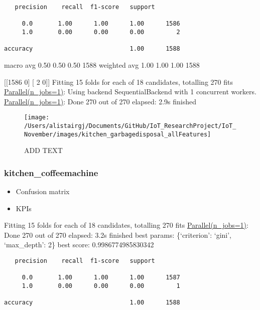 \documentclass[11pt,]{article}
\providecommand{\tightlist}{%
  \setlength{\itemsep}{0pt}\setlength{\parskip}{0pt}}
\begin{document}
\begin{verbatim}
   precision    recall  f1-score   support

     0.0       1.00      1.00      1.00      1586
     1.0       0.00      0.00      0.00         2

accuracy                           1.00      1588
\end{verbatim}

macro avg 0.50 0.50 0.50 1588 weighted avg 1.00 1.00 1.00 1588

{[}{[}1586 0{]} {[} 2 0{]}{]} Fitting 15 folds for each of 18
candidates, totalling 270 fits
\href{Done\%20270\%20out\%20of\%20270\%20\%7C\%20elapsed:\%202.1s\%20finished}{Parallel(n\_jobs=1)}:
Using backend SequentialBackend with 1 concurrent workers.
\href{Done\%20270\%20out\%20of\%20270\%20\%7C\%20elapsed:\%202.1s\%20finished}{Parallel(n\_jobs=1)}:
Done 270 out of 270 \textbar{} elapsed: 2.9s finished

\begin{figure}[H]

{\centering \texttt{[image: /Users/alistairgj/Documents/GitHub/IoT\_ResearchProject/IoT\_November/images/kitchen\_garbagedisposal\_allFeatures]} 

}

\caption{ADD TEXT}\label{fig:unnamed-chunk-16}
\end{figure}

\pagebreak

\hypertarget{kitchen_coffeemachine}{%
\subsubsection{kitchen\_coffeemachine}\label{kitchen_coffeemachine}}

\begin{itemize}
\tightlist
\item
  Confusion matrix
\item
  KPIs
\end{itemize}

Fitting 15 folds for each of 18 candidates, totalling 270 fits
\href{Done\%20270\%20out\%20of\%20270\%20\%7C\%20elapsed:\%202.1s\%20finished}{Parallel(n\_jobs=1)}:
Done 270 out of 270 \textbar{} elapsed: 3.2s finished best params:
\{`criterion': `gini', `max\_depth': 2\} best score: 0.9986774985830342

\begin{verbatim}
   precision    recall  f1-score   support

     0.0       1.00      1.00      1.00      1587
     1.0       0.00      0.00      0.00         1

accuracy                           1.00      1588
\end{verbatim}
\end{document}
